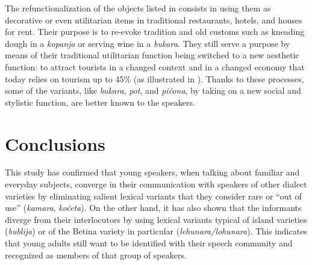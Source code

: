 \documentclass[output=paper]{LSP/langsci}
\begin{document}
\begin{table}
\caption{The aestheticisation and refunctionalization of objects}
\label{tab:6}
\end{table}

The refunctionalization of the objects listed in  consists in using them as decorative or even utilitarian items in traditional restaurants, hotels, and houses for rent. Their purpose is to re-evoke tradition and old customs such as kneading dough in a \textit{kopanja} or serving wine in a \textit{bukara}. They still serve a purpose by means of their traditional utilitarian function being switched to a new aesthetic function: to attract tourists in a changed context and in a changed economy that today relies on tourism up to 45\% (as illustrated in ). Thanks to these processes, some of the variants, like \textit{bukara}, \textit{pot}, and \textit{pičona}, by taking on a new social and stylistic function, are better known to the speakers. 

\section{Conclusions}
This study has confirmed that young speakers, when talking about familiar and everyday subjects, converge in their communication with speakers of other dialect varieties by eliminating salient lexical variants that they consider rare or “out of use” (\textit{kamara}, \textit{kočeta}). On the other hand, it has also shown that the informants diverge from their interlocutors by using lexical variants typical of island varieties (\textit{bublija}) or of the Betina variety in particular (\textit{lehunara/lohunara}). This indicates that young adults still want to be identified with their speech community and recognized as members of that group of speakers. 
\end{document}
